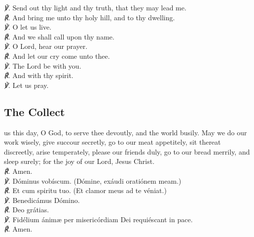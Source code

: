 \textit{\scshape ℣.} Send out thy light and thy truth, that they may lead me.\\
\textit{\scshape ℟.} And bring me unto thy holy hill, and to thy dwelling.\\
\textit{\scshape ℣.} O let us live.\\
\textit{\scshape ℟.} And we shall call upon thy name.\\
\textit{\scshape ℣.} O Lord, hear our prayer.\\
\textit{\scshape ℟.} And let our cry come unto thee.\\
\textit{\scshape ℣.} The Lord be with you.\\
\textit{\scshape ℟.} And with thy spirit.\\
\textit{\scshape ℣.} Let us pray.
\subsection{The Collect}
 us this day, O God, to serve thee devoutly, and the world busily. May we do our work wisely, give succour secretly, go to our meat appetitely, sit thereat discreetly, arise temperately, please our friends duly, go to our bread merrily, and sleep surely; for the joy of our Lord, Jesus Christ.\\
\textit{\scshape ℟.} Amen.\\
{
	\textit{\scshape ℣.} Dóminus vobíscum. (Dómine, exáudi oratiónem meam.)\\
	\textit{\scshape ℟.} Et cum spiritu tuo. (Et clamor meus ad te véniat.)\\
	\textit{\scshape ℣.} Benedicámus Dómino.\\
	\textit{\scshape ℟.} Deo grátias.\\
	\textit{\scshape ℣.} Fidélium ánim{\ae} {} per misericórdiam Dei requiéscant in pace.\\
	\textit{\scshape ℟.} Amen.
}